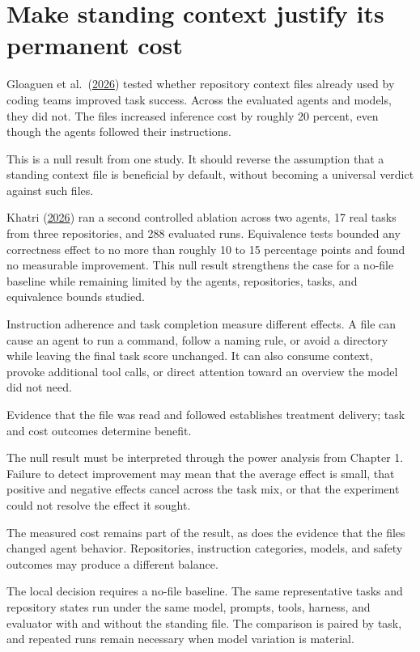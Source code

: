 \hypertarget{make-standing-context-justify-its-permanent-cost}{%
\section{Make standing context justify its permanent cost}\label{make-standing-context-justify-its-permanent-cost}}

Gloaguen et al.~(\href{https://arxiv.org/abs/2602.11988}{2026}) tested whether repository context files already used by coding teams improved task success. Across the evaluated agents and models, they did not. The files increased inference cost by roughly 20 percent, even though the agents followed their instructions.

This is a null result from one study. It should reverse the assumption that a standing context file is beneficial by default, without becoming a universal verdict against such files.

Khatri (\href{https://arxiv.org/abs/2607.27250}{2026}) ran a second controlled ablation across two agents, 17 real tasks from three repositories, and 288 evaluated runs. Equivalence tests bounded any correctness effect to no more than roughly 10 to 15 percentage points and found no measurable improvement. This null result strengthens the case for a no-file baseline while remaining limited by the agents, repositories, tasks, and equivalence bounds studied.

Instruction adherence and task completion measure different effects. A file can cause an agent to run a command, follow a naming rule, or avoid a directory while leaving the final task score unchanged. It can also consume context, provoke additional tool calls, or direct attention toward an overview the model did not need.

Evidence that the file was read and followed establishes treatment delivery; task and cost outcomes determine benefit.

The null result must be interpreted through the power analysis from Chapter 1. Failure to detect improvement may mean that the average effect is small, that positive and negative effects cancel across the task mix, or that the experiment could not resolve the effect it sought.

The measured cost remains part of the result, as does the evidence that the files changed agent behavior. Repositories, instruction categories, models, and safety outcomes may produce a different balance.

The local decision requires a no-file baseline. The same representative tasks and repository states run under the same model, prompts, tools, harness, and evaluator with and without the standing file. The comparison is paired by task, and repeated runs remain necessary when model variation is material.

